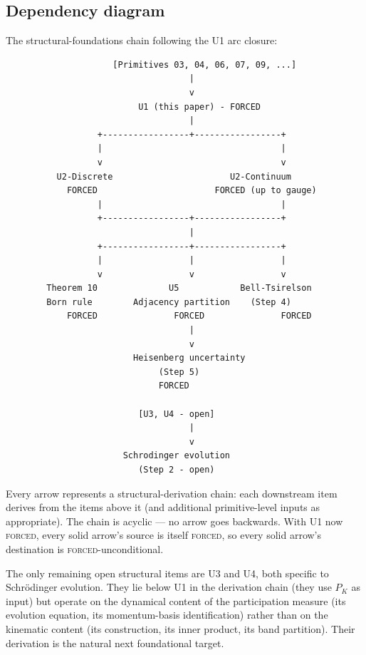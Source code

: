 \documentclass[11pt,a4paper]{article}
\begin{document}
\subsection{Dependency diagram}

The structural-foundations chain following the U1 arc closure:

\begin{verbatim}
                     [Primitives 03, 04, 06, 07, 09, ...]
                                    |
                                    v
                          U1 (this paper) - FORCED
                                    |
                  +-----------------+-----------------+
                  |                                   |
                  v                                   v
          U2-Discrete                       U2-Continuum
            FORCED                       FORCED (up to gauge)
                  |                                   |
                  +-----------------+-----------------+
                                    |
                  +-----------------+-----------------+
                  |                 |                 |
                  v                 v                 v
        Theorem 10              U5            Bell-Tsirelson
        Born rule        Adjacency partition    (Step 4)
            FORCED               FORCED               FORCED
                                    |
                                    v
                         Heisenberg uncertainty
                              (Step 5)
                              FORCED

                          [U3, U4 - open]
                                    |
                                    v
                       Schrodinger evolution
                          (Step 2 - open)
\end{verbatim}

Every arrow represents a structural-derivation chain: each downstream item derives from the items above it (and additional primitive-level inputs as appropriate). The chain is acyclic --- no arrow goes backwards. With U1 now \textsc{forced}, every solid arrow's source is itself \textsc{forced}, so every solid arrow's destination is \textsc{forced}-unconditional.

The only remaining open structural items are U3 and U4, both specific to Schr\"odinger evolution. They lie below U1 in the derivation chain (they use $P_K$ as input) but operate on the dynamical content of the participation measure (its evolution equation, its momentum-basis identification) rather than on the kinematic content (its construction, its inner product, its band partition). Their derivation is the natural next foundational target.
\end{document}

